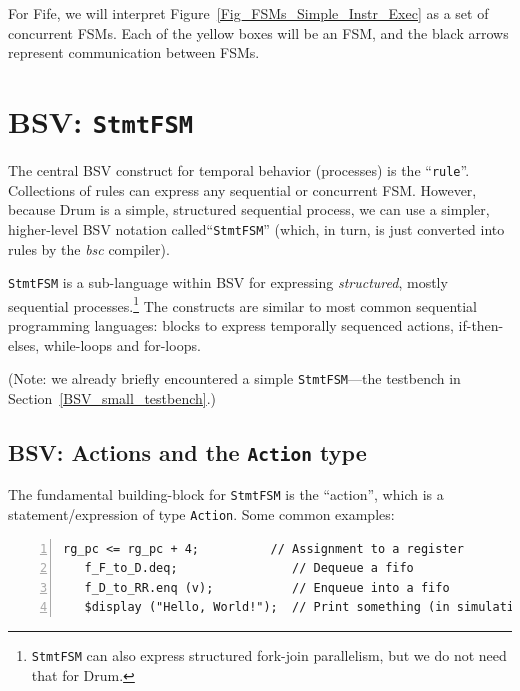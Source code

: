 For Fife, we will interpret Figure~\ref{Fig_FSMs_Simple_Instr_Exec} as
a set of concurrent FSMs.  Each of the yellow boxes will be an FSM,
and the black arrows represent communication between FSMs.


\section{BSV: {\tt StmtFSM}}

\label{Sec_FSMs_StmtFSM}


The central BSV construct for temporal behavior (processes) is the
``\verb|rule|''.  Collections of rules can express any sequential or
concurrent FSM.  However, because Drum is a simple, structured
sequential process, we can use a simpler, higher-level BSV notation
called``\verb|StmtFSM|'' (which, in turn, is just converted into rules
by the \emph{bsc} compiler).

\verb|StmtFSM| is a sub-language within BSV for expressing
\emph{structured}, mostly sequential processes.\footnote{{\tt StmtFSM}
can also express structured fork-join parallelism, but we do not need
that for Drum.}  The constructs are similar to most common
sequential programming languages: blocks to express temporally
sequenced actions, if-then-elses, while-loops and for-loops.

(Note: we already briefly encountered a simple \verb|StmtFSM|---the
testbench in Section~\ref{BSV_small_testbench}.)


\subsection{BSV: Actions and the {\tt Action} type}


The fundamental building-block for \verb|StmtFSM| is the ``action'',
which is a statement/expression of type \verb|Action|.  Some common
examples:

\begin{Verbatim}[frame=single, numbers=left]
   rg_pc <= rg_pc + 4;          // Assignment to a register
   f_F_to_D.deq;                // Dequeue a fifo
   f_D_to_RR.enq (v);           // Enqueue into a fifo
   $display ("Hello, World!");  // Print something (in simulation only)
\end{Verbatim}


